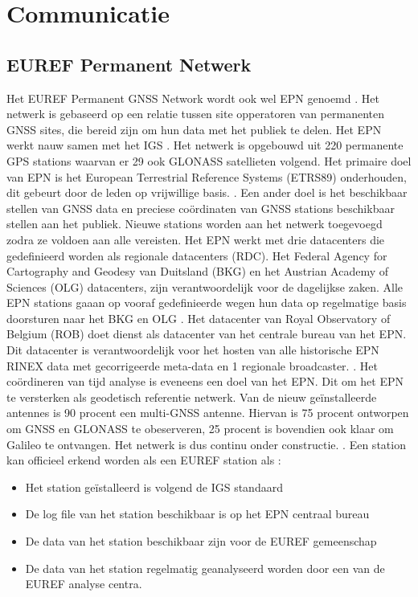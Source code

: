 \section{Communicatie}
\label{LCom}
\subsection{EUREF Permanent Netwerk}
Het EUREF Permanent GNSS Network wordt ook wel EPN genoemd \cite{LBibEPN3,LBibEPN2,LBibEPN}. Het netwerk is gebaseerd op een relatie tussen site opperatoren van permanenten GNSS sites, die bereid zijn om hun data met het publiek te delen. Het EPN werkt nauw samen met het IGS \cite{LBibEPN3}. Het netwerk is opgebouwd uit 220 permanente GPS stations waarvan er 29 ook GLONASS satellieten volgend. Het primaire doel van EPN is het European Terrestrial Reference Systems (ETRS89) onderhouden, dit gebeurt door de leden op vrijwillige basis. \cite{LBibEPN}  \cite{LBibEPN2}. Een ander doel is het beschikbaar stellen van GNSS data en preciese co\"ordinaten van GNSS stations beschikbaar stellen aan het publiek. Nieuwe stations worden aan het netwerk toegevoegd zodra ze voldoen aan alle vereisten. Het EPN werkt met drie datacenters die gedefinieerd worden als regionale datacenters (RDC). Het Federal Agency for Cartography and Geodesy van Duitsland (BKG) en het Austrian Academy of Sciences (OLG)  datacenters, zijn verantwoordelijk voor de dagelijkse zaken. Alle EPN stations gaaan op vooraf gedefinieerde wegen hun data op regelmatige basis doorsturen naar het BKG en OLG \cite{LBibEPN2}. Het datacenter van Royal Observatory of Belgium (ROB) doet dienst als datacenter van het centrale bureau van het EPN. Dit datacenter is verantwoordelijk voor het hosten van alle historische EPN RINEX data met gecorrigeerde meta-data en 1 regionale broadcaster. \cite{LBibEPN2,LBibEPN3}. Het co\"ordineren van tijd analyse is eveneens een doel van het EPN. Dit om het EPN te versterken als geodetisch referentie netwerk. Van de nieuw ge\"installeerde antennes is 90 procent een multi-GNSS antenne. Hiervan is 75 procent ontworpen om GNSS en GLONASS te obeserveren, 25 procent is bovendien ook klaar om Galileo te ontvangen. Het netwerk is dus continu onder constructie. \cite{LBibEPN3}. Een station kan officieel erkend worden als een EUREF station als \cite{LBibGNSS8}:
\begin{itemize}
	\item Het station ge\"istalleerd is volgend de IGS standaard
	\item De log file van het station beschikbaar is op het EPN centraal bureau
	\item De data van het station beschikbaar zijn voor de EUREF gemeenschap
	\item De data van het station regelmatig geanalyseerd worden door een van de EUREF analyse centra. 
\end{itemize}

